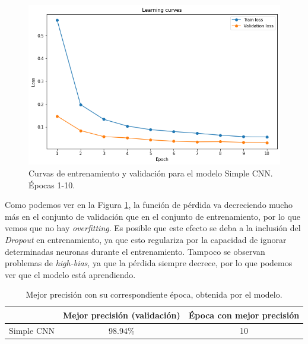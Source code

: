\documentclass[12pt]{scrartcl}
\begin{document}
\begin{itemize}
    \begin{figure}[H]
        \centering
        \includegraphics[scale=0.48]{curvas1.png}
        \caption{Curvas de entrenamiento y validación para el modelo Simple CNN. Épocas 1-10.}
        \label{fig:curvas1}
    \end{figure}
    
    Como podemos ver en la Figura \ref{fig:curvas1}, la función de pérdida va decreciendo mucho más en el conjunto de validación que en el conjunto de entrenamiento, por lo que vemos que no hay \emph{overfitting}.
    Es posible que este efecto se deba a la inclusión del \emph{Dropout} en entrenamiento, ya que esto regulariza por la capacidad de ignorar determinadas neuronas durante el entrenamiento. Tampoco se observan 
    problemas de \emph{high-bias}, ya que la pérdida siempre decrece, por lo que podemos ver que el modelo está aprendiendo.

    \begin{table}[H]
        \centering
        \begin{tabular}{l c|l}
        \multicolumn{1}{c}{}             & \cellcolor[HTML]{E3E7EC}Mejor precisión (validación) & \cellcolor[HTML]{E3E7EC} Época con mejor precisión \\ \hline
        \cellcolor[HTML]{E3E7EC}Simple CNN & 98.94\%                                              & \multicolumn{1}{c}{10}   \\ 
        \end{tabular}
        \caption{Mejor precisión con su correspondiente época, obtenida por el modelo.}
        \label{table:resultsprec}
        \end{table}


\end{itemize}
\end{document}
